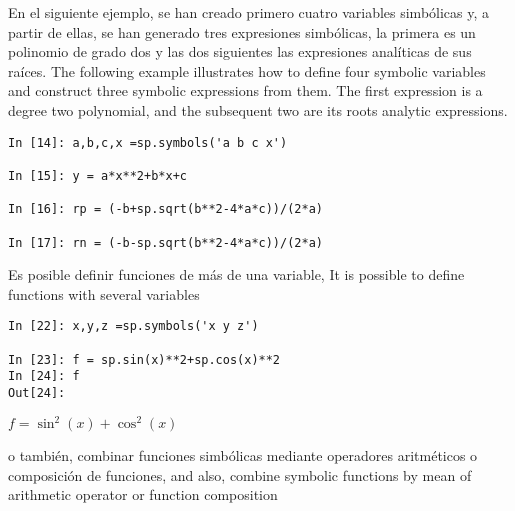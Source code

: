 \begin{paracol}{2}
En el siguiente ejemplo, se han creado primero cuatro variables simbólicas y, a partir de ellas, se han generado tres expresiones simbólicas, la primera es un polinomio de grado dos y las dos siguientes las expresiones analíticas de sus raíces.
\switchcolumn
The following example illustrates how to define four symbolic variables and construct three symbolic expressions from them. The first expression is a degree two polynomial, and the subsequent two are its roots analytic expressions.

\end{paracol}
\begin{center}
\begin{minipage}{.5\textwidth}
	\begin{verbatim}
In [14]: a,b,c,x =sp.symbols('a b c x')

In [15]: y = a*x**2+b*x+c

In [16]: rp = (-b+sp.sqrt(b**2-4*a*c))/(2*a)

In [17]: rn = (-b-sp.sqrt(b**2-4*a*c))/(2*a)
	\end{verbatim}
\end{minipage}
\end{center}
\begin{paracol}{2}
Es posible definir funciones de más de una variable,
\switchcolumn
It is possible to define functions with several variables
\end{paracol}
\begin{center}
	\begin{minipage}{.5\textwidth}
		\begin{verbatim}
In [22]: x,y,z =sp.symbols('x y z')
			
In [23]: f = sp.sin(x)**2+sp.cos(x)**2
In [24]: f
Out[24]: 
		\end{verbatim}
		$f = \sin^2(x) + \cos^2(x)$
	\end{minipage}
\end{center}

\begin{paracol}{2}
o también, combinar funciones simbólicas mediante operadores aritméticos o composición de funciones,
\switchcolumn
and also, combine symbolic functions by mean of arithmetic operator or function composition
\end{paracol}
 
